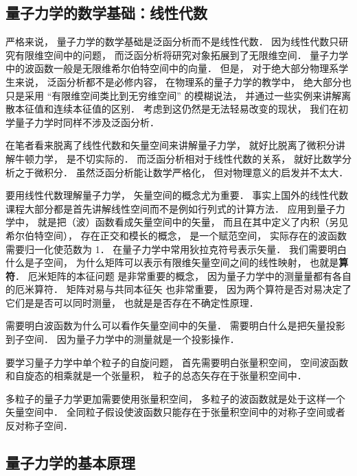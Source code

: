 
\begin{issues}
\issueDraft
\end{issues}

\subsection{量子力学的数学基础：线性代数}
严格来说， 量子力学的数学基础是泛函分析而不是线性代数． 因为线性代数只研究有限维空间中的问题， 而泛函分析将研究对象拓展到了无限维空间． 量子力学中的波函数一般是无限维希尔伯特空间中的向量． 但是， 对于绝大部分物理系学生来说， 泛函分析都不是必修内容， 在物理系的量子力学的教学中， 绝大部分也只是采用 “有限维空间类比到无穷维空间” 的模糊说法， 并通过一些实例来讲解离散本征值和连续本征值的区别． 考虑到这仍然是无法轻易改变的现状， 我们在初学量子力学时同样不涉及泛函分析．

在笔者看来脱离了线性代数和矢量空间来讲解量子力学， 就好比脱离了微积分讲解牛顿力学， 是不切实际的． 而泛函分析相对于线性代数的关系， 就好比数学分析之于微积分． 虽然泛函分析能让数学严格化， 但对物理意义的启发并不太大．

要用线性代数理解量子力学， 矢量空间的概念尤为重要． 事实上国外的线性代数课程大部分都是首先讲解线性空间而不是例如行列式的计算方法． 应用到量子力学中， 就是把（波）函数看成矢量空间中的矢量， 而且在其中定义了内积（另见希尔伯特空间）， 存在正交和模长的概念， 是一个赋范空间， 实际存在的波函数需要归一化使范数为 1． 在量子力学中常用狄拉克符号表示矢量． 我们需要明白什么是子空间， 为什么矩阵可以表示有限维矢量空间之间的线性映射， 也就是\textbf{算符}． 厄米矩阵的本征问题 是非常重要的概念， 因为量子力学中的测量量都有各自的厄米算符． 矩阵对易与共同本征矢 也非常重要， 因为两个算符是否对易决定了它们是是否可以同时测量， 也就是是否存在不确定性原理．

需要明白波函数为什么可以看作矢量空间中的矢量． 需要明白什么是把矢量投影到子空间． 因为量子力学中的测量就是一个投影操作．

要学习量子力学中单个粒子的自旋问题， 首先需要明白张量积空间， 空间波函数和自旋态的相乘就是一个张量积， 粒子的总态矢存在于张量积空间中．

多粒子的量子力学更加需要使用张量积空间， 多粒子的波函数就是处于这样一个矢量空间中． 全同粒子假设使波函数只能存在于张量积空间中的对称子空间或者反对称子空间．

\subsection{量子力学的基本原理}

